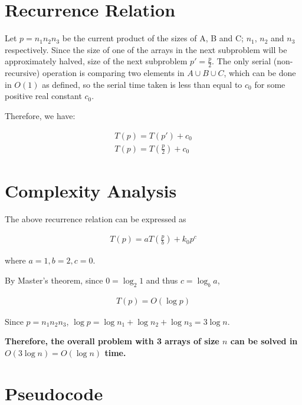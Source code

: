 \documentclass{article}
\begin{document}
\section{Recurrence Relation}

Let $p = n_1n_2n_3$ be the current product of the sizes of A, B and C; $n_1$, $n_2$ and $n_3$ respectively. Since the size of one of the arrays in the next subproblem will be approximately halved, size of the next subproblem $p' = \frac{p}{2}$. The only serial (non-recursive) operation is comparing two elements in $A \cup B \cup C$, which can be done in $O(1)$ as defined, so the serial time taken is less than equal to $c_0$ for some positive real constant $c_0$. 

Therefore, we have:

\begin{align*}
    T(p) = T(p') + c_0 \\
    T(p) = T(\frac{p}{2}) + c_0
\end{align*}

\section{Complexity Analysis}

The above recurrence relation can be expressed as 

\begin{align*}
    T(p) = aT(\frac{p}{b}) + k_0p^c
\end{align*}

where $a = 1, b = 2, c = 0$.

By Master's theorem, since $0 = \log_2{1}$ and thus $c = \log_b{a}$, 

\begin{align*}
    T(p) = O(\log p)
\end{align*}

Since $p = n_1n_2n_3$, $\log p = \log n_1 + \log n_2 + \log n_3 = 3 \log n$.

\textbf{Therefore, the overall problem with 3 arrays of size $n$ can be solved in $O(3 \log n) = O(\log n)$ time.} 

\section{Pseudocode}

\newpage
\end{document}
